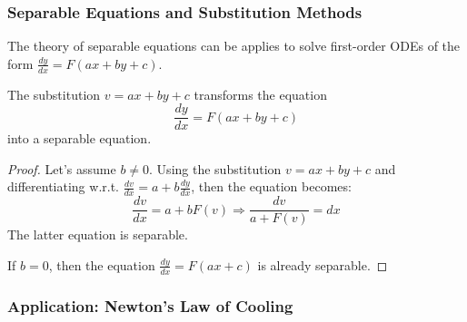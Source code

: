 \documentclass[a4paper]{article}
\begin{document}
\subsubsection{Separable Equations and Substitution Methods}

The theory of separable equations can be applies to solve first-order ODEs of the form $\tfrac{dy}{dx} = F(ax + by + c)$.
\begin{corollary}
The substitution $v=ax+by+c$ transforms the equation
\begin{equation}
\frac{dy}{dx} = F(ax+by+c)
\end{equation}
into a separable equation.
\end{corollary}
\begin{proof}
Let's assume $b\neq 0$. Using the substitution $v=ax+by+c$ and differentiating w.r.t. $\tfrac{dv}{dx} = a + b\tfrac{dy}{dx}$, then the equation becomes:
\[
\frac{dv}{dx} = a + bF(v) \Rightarrow \frac{dv}{a+F(v)} = dx
\]
The latter equation is separable.

If $b=0$, then the equation $\tfrac{dy}{dx} = F(ax + c)$ is already separable.
\end{proof}

\subsubsection{Application: Newton's Law of Cooling}
\end{document}
